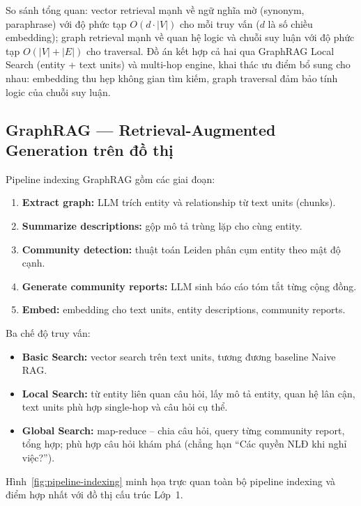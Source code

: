 \documentclass[../DoAn.tex]{subfiles}
\begin{document}
So sánh tổng quan: vector retrieval mạnh về ngữ nghĩa mờ (synonym, paraphrase) với độ phức tạp $O(d \cdot |V|)$ cho mỗi truy vấn ($d$ là số chiều embedding); graph retrieval mạnh về quan hệ logic và chuỗi suy luận với độ phức tạp $O(|V| + |E|)$ cho traversal. Đồ án kết hợp cả hai qua GraphRAG Local Search (entity + text units) và multi-hop engine, khai thác ưu điểm bổ sung cho nhau: embedding thu hẹp không gian tìm kiếm, graph traversal đảm bảo tính logic của chuỗi suy luận.

\subsection{GraphRAG --- Retrieval-Augmented Generation trên đồ thị}
\label{subsection:graphrag_pipeline}

Pipeline indexing GraphRAG gồm các giai đoạn:

\begin{enumerate}[nosep, leftmargin=*]
    \item \textbf{Extract graph:} LLM trích entity và relationship từ text units (chunks).
    \item \textbf{Summarize descriptions:} gộp mô tả trùng lặp cho cùng entity.
    \item \textbf{Community detection:} thuật toán Leiden phân cụm entity theo mật độ cạnh.
    \item \textbf{Generate community reports:} LLM sinh báo cáo tóm tắt từng cộng đồng.
    \item \textbf{Embed:} embedding cho text units, entity descriptions, community reports.
\end{enumerate}

Ba chế độ truy vấn:

\begin{itemize}[nosep, leftmargin=*]
    \item \textbf{Basic Search:} vector search trên text units, tương đương baseline Naive RAG.
    \item \textbf{Local Search:} từ entity liên quan câu hỏi, lấy mô tả entity, quan hệ lân cận, text units phù hợp single-hop và câu hỏi cụ thể.
    \item \textbf{Global Search:} map-reduce -- chia câu hỏi, query từng community report, tổng hợp; phù hợp câu hỏi khám phá (chẳng hạn ``Các quyền NLĐ khi nghỉ việc?'').
\end{itemize}

Hình~\ref{fig:pipeline-indexing} minh họa trực quan toàn bộ pipeline indexing và điểm hợp nhất với đồ thị cấu trúc Lớp~1.
\end{document}
